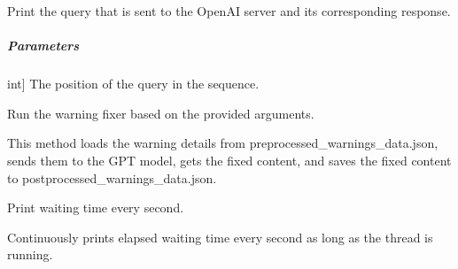 \documentclass[letterpaper,10pt,english]{sphinxmanual}
\begin{document}
\begin{fulllineitems}
\begin{fulllineitems}
\label{\detokenize{main.DoxygenWarningFixer:main.DoxygenWarningFixer.doxygen_warning_fixer.DoxygenWarningFixer.print_query}}
\pysigstartsignatures
{}
\pysigstopsignatures
\sphinxAtStartPar
Print the query that is sent to the OpenAI server and its corresponding response.


\subparagraph{Parameters}
\label{\detokenize{main.DoxygenWarningFixer:parameters}}\begin{description}
\sphinxlineitem{pos}{[}int{]}
\sphinxAtStartPar
The position of the query in the sequence.

\end{description}

\end{fulllineitems}


\begin{fulllineitems}
\label{\detokenize{main.DoxygenWarningFixer:main.DoxygenWarningFixer.doxygen_warning_fixer.DoxygenWarningFixer.run}}
\pysigstartsignatures
{}
\pysigstopsignatures
\sphinxAtStartPar
Run the warning fixer based on the provided arguments.

\sphinxAtStartPar
This method loads the warning details from preprocessed\_warnings\_data.json, sends them to the GPT model,
gets the fixed content, and saves the fixed content to postprocessed\_warnings\_data.json.

\end{fulllineitems}


\begin{fulllineitems}
\label{\detokenize{main.DoxygenWarningFixer:main.DoxygenWarningFixer.doxygen_warning_fixer.DoxygenWarningFixer.wait}}
\pysigstartsignatures
{}
\pysigstopsignatures
\sphinxAtStartPar
Print waiting time every second.

\sphinxAtStartPar
Continuously prints elapsed waiting time every second as long as the thread is running.

\end{fulllineitems}


\end{fulllineitems}
\end{document}
